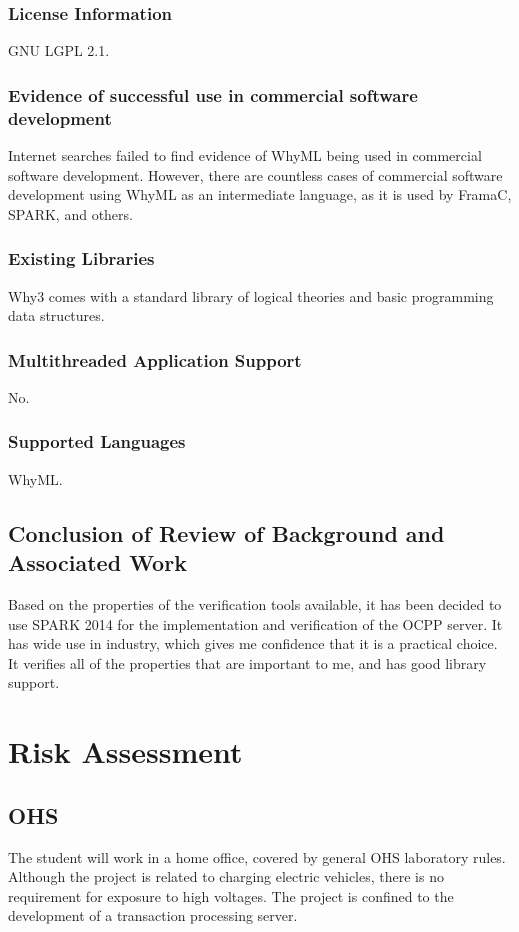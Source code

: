 \documentclass[11pt]{article}
\begin{document}
	\subsubsection{License Information}
	GNU LGPL 2.1.
	\subsubsection{Evidence of successful use in commercial software development}
		Internet searches failed to find evidence of WhyML being used in commercial software development. However, there are countless cases of commercial software development using WhyML as an intermediate language, as it is used by FramaC, SPARK, and others.
 
	\subsubsection{Existing Libraries}
	Why3 comes with a standard library of logical theories and basic programming data structures.
	\subsubsection{Multithreaded Application Support}
	No.
	\subsubsection{Supported Languages}
	WhyML.

\subsection{Conclusion of Review of Background and Associated Work}
Based on the properties of the verification tools available, it has been decided to use SPARK 2014 for the implementation and verification of the OCPP server. It has wide use in industry, which gives me confidence that it is a practical choice. It verifies all of the properties that are important to me, and has good library support.


\section{Risk Assessment}

\subsection{OHS} 
The student will work in a home office, covered by general OHS laboratory rules. Although the project is related to charging electric vehicles, there is no requirement for exposure to high voltages. The project is confined to the development of a transaction processing server.
 
\end{document}
